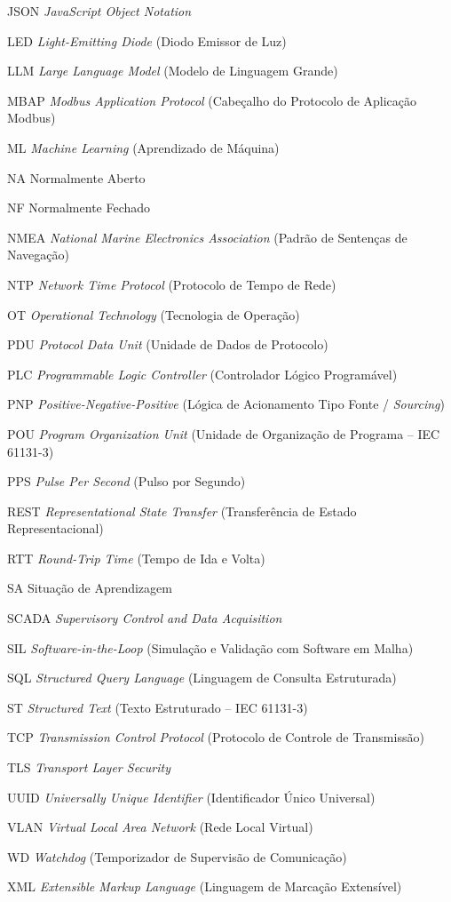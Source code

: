 \begin{siglas}
  \item[JSON] \textit{JavaScript Object Notation}
  \item[LED] \textit{Light-Emitting Diode} (Diodo Emissor de Luz)
  \item[LLM] \textit{Large Language Model} (Modelo de Linguagem Grande)
  \item[MBAP] \textit{Modbus Application Protocol} (Cabeçalho do Protocolo de Aplicação Modbus)
  \item[ML] \textit{Machine Learning} (Aprendizado de Máquina)
  \item[NA] Normalmente Aberto
  \item[NF] Normalmente Fechado
  \item[NMEA] \textit{National Marine Electronics Association} (Padrão de Sentenças de Navegação)
  \item[NTP] \textit{Network Time Protocol} (Protocolo de Tempo de Rede)
  \item[OT] \textit{Operational Technology} (Tecnologia de Operação)
  \item[PDU] \textit{Protocol Data Unit} (Unidade de Dados de Protocolo)
  \item[PLC] \textit{Programmable Logic Controller} (Controlador Lógico Programável)
  \item[PNP] \textit{Positive-Negative-Positive} (Lógica de Acionamento Tipo Fonte / \textit{Sourcing})
  \item[POU] \textit{Program Organization Unit} (Unidade de Organização de Programa -- IEC 61131-3)
  \item[PPS] \textit{Pulse Per Second} (Pulso por Segundo)
  \item[REST] \textit{Representational State Transfer} (Transferência de Estado Representacional)
  \item[RTT] \textit{Round-Trip Time} (Tempo de Ida e Volta)
  \item[SA] Situação de Aprendizagem
  \item[SCADA] \textit{Supervisory Control and Data Acquisition}
  \item[SIL] \textit{Software-in-the-Loop} (Simulação e Validação com Software em Malha)
  \item[SQL] \textit{Structured Query Language} (Linguagem de Consulta Estruturada)
  \item[ST] \textit{Structured Text} (Texto Estruturado -- IEC 61131-3)
  \item[TCP] \textit{Transmission Control Protocol} (Protocolo de Controle de Transmissão)
  \item[TLS] \textit{Transport Layer Security}
  \item[UUID] \textit{Universally Unique Identifier} (Identificador Único Universal)
  \item[VLAN] \textit{Virtual Local Area Network} (Rede Local Virtual)
  \item[WD] \textit{Watchdog} (Temporizador de Supervisão de Comunicação)
  \item[XML] \textit{Extensible Markup Language} (Linguagem de Marcação Extensível)
\end{siglas}
